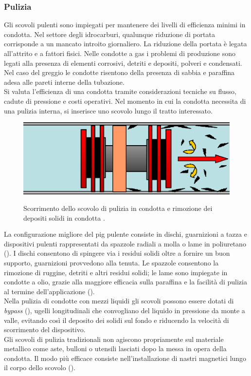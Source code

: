 \subsubsection{Pulizia}
Gli scovoli pulenti sono impiegati per mantenere dei livelli di efficienza minimi in condotta. Nel settore degli idrocarburi, qualunque riduzione di portata corrisponde a un mancato introito giornaliero. La riduzione della portata è legata all'attrito e a fattori fisici. Nelle condotte a gas i problemi di produzione sono legati alla presenza di elementi corrosivi, detriti e depositi, polveri e condensati. Nel caso del greggio le condotte risentono della presenza di sabbia e paraffina adesa alle pareti interne della tubazione.\\
Si valuta l'efficienza di una condotta tramite considerazioni tecniche su flusso, cadute di pressione e costi operativi. Nel momento in cui la condotta necessita di una pulizia interna, si inserisce uno scovolo lungo il tratto interessato.\\
\begin{figure}[htbp]
	\centering
	\includegraphics[width=.7\textwidth]{fig/pig/cleaning.eps}
	\label{fig:cleaningpig}
	\caption{Scorrimento dello scovolo di pulizia in condotta e rimozione dei depositi solidi in condotta \parencite{davidson2002introduction}.}
\end{figure}
La configurazione migliore del pig pulente consiste in dischi, guarnizioni a tazza e dispositivi pulenti rappresentati da spazzole radiali a molla o lame in poliuretano (). I dischi consentono di spingere via i residui solidi oltre a fornire un buon supporto, guarnizioni provvedono alla tenuta. Le spazzole consentono la rimozione di ruggine, detriti e altri residui solidi; le lame sono impiegate in condotte a olio, grazie alla maggiore efficacia sulla paraffina e la facilità di pulizia al termine dell'applicazione (). \\
Nella pulizia di condotte con mezzi liquidi gli scovoli possono essere dotati di \textit{bypass} (), ugelli longitudinali che convogliano del liquido in pressione da monte a valle, evitando così il deposito dei solidi sul fondo e riducendo la velocità di scorrimento del dispositivo.\\
Gli scovoli di pulizia tradizionali non agiscono propriamente sul materiale metallico come aste, bulloni o utensili lasciati dopo la messa in opera della condotta. Il modo più efficace consiste nell'installazione di nastri magnetici lungo il corpo dello scovolo (). 

